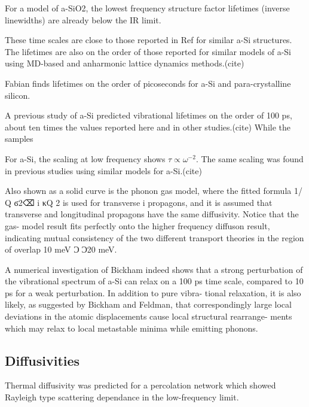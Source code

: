 \documentclass[aps,prb,twocolumn,superscriptaddress,footinbib,amsmath,amssymb,floatfix]{revtex4}
\begin{document}
For a model of a-SiO2, the lowest frequency structure factor 
lifetimes (inverse linewidths) are already below the IR limit.
\cite{taraskin_phonons_1997}

These time scales are close to those reported in Ref for similar 
a-Si structures. The lifetimes are also on the order of those
reported for similar models of a-Si using MD-based and anharmonic 
lattice dynamics methods.(cite) 

Fabian finds lifetimes on the order of picoseconds for a-Si and 
para-crystalline silicon.
\cite{fabian_anharmonic_1996,fabian_numerical_2003}

A previous study of a-Si predicted vibrational lifetimes on the 
order of 100 ps, about ten times the values reported here and in 
other studies.(cite) While the samples 

For a-Si, the scaling at low frequency shows 
$\tau \propto \omega^{-2}$.  The same scaling was found in previous 
studies using similar models for a-Si.(cite) 

Also
shown as a solid curve is the phonon gas model, where the
fitted formula 1/␶ Q ϭ2⌫ i κQ 2
is used for transverse
i
propagons, and it is assumed that transverse and longitudinal
propagons have the same diffusivity. Notice that the gas-
model result fits perfectly onto the higher frequency diffuson
result, indicating mutual consistency of the two different
transport theories in the region of overlap 10 meV Ͻ␻Ͻ20
meV.

A numerical investigation of Bickham\cite{bickham_numerical_1999} 
indeed shows that a strong perturbation of the vibrational
spectrum of a-Si can relax on a 100 ps time scale, compared
to 10 ps for a weak perturbation. In addition to pure vibra-
tional relaxation, it is also likely, as suggested by Bickham
and Feldman,\cite{bickham_calculation_1998} 
that correspondingly large local deviations in
the atomic displacements cause local structural rearrange-
ments which may relax to local metastable minima while
emitting phonons.

\subsection{\label{S:Diffusivities}Diffusivities}


Thermal diffusivity was predicted for a percolation network which showed 
Rayleigh type scattering dependance in the low-frequency limit.
\cite{sheng_heat_1991}
\end{document}
